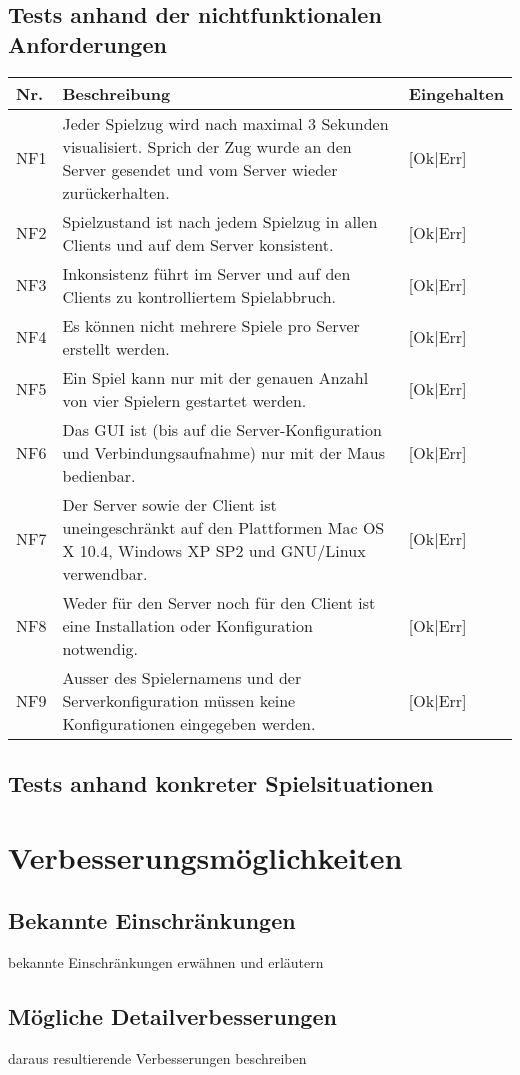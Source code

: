 \documentclass[12pt,halfparskip]{scrartcl}
\begin{document}
\subsection{Tests anhand der nichtfunktionalen Anforderungen}
	\begin {tabular}{l p{11cm} l}
		\toprule
		\textbf{Nr.} & \textbf{Beschreibung} & \textbf{Eingehalten} \\
		\midrule
		NF1 & Jeder Spielzug wird nach maximal 3 Sekunden visualisiert. Sprich der Zug wurde an den Server gesendet und vom Server wieder zurückerhalten. & [Ok|Err] \\
		NF2 & Spielzustand ist nach jedem Spielzug in allen Clients und auf dem Server konsistent. & [Ok|Err] \\
		NF3 & Inkonsistenz führt im Server und auf den Clients zu kontrolliertem Spielabbruch. & [Ok|Err] \\
		NF4 & Es können nicht mehrere Spiele pro Server erstellt werden. & [Ok|Err] \\
		NF5 & Ein Spiel kann nur mit der genauen Anzahl von vier Spielern gestartet werden. & [Ok|Err] \\
		NF6 & Das GUI ist (bis auf die Server-Konfiguration und Verbindungsaufnahme) nur mit der Maus bedienbar. & [Ok|Err] \\
		NF7 & Der Server sowie der Client ist uneingeschränkt auf den Plattformen Mac OS X 10.4, Windows XP SP2 und GNU/Linux verwendbar. & [Ok|Err] \\
		NF8 & Weder für den Server noch für den Client ist eine Installation oder Konfiguration notwendig. & [Ok|Err] \\
		NF9 & Ausser des Spielernamens und der Serverkonfiguration müssen keine Konfigurationen eingegeben werden. & [Ok|Err] \\
		\bottomrule
	\end{tabular}
	
\subsection{Tests anhand konkreter Spielsituationen}

\section{Verbesserungsmöglichkeiten}

\subsection{Bekannte Einschränkungen}
bekannte Einschränkungen erwähnen und erläutern

\subsection{Mögliche Detailverbesserungen}
daraus resultierende Verbesserungen beschreiben
\end{document}
